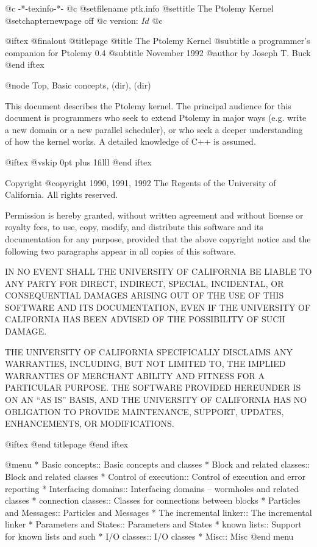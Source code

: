       @c -*-texinfo-*-
@c %
@setfilename ptk.info
@settitle The Ptolemy Kernel
@setchapternewpage off
@c version: $Id$
@c %

@iftex
@finalout
@titlepage
@title The Ptolemy Kernel
@subtitle a programmer's companion for Ptolemy 0.4
@subtitle November 1992
@author by Joseph T. Buck
@end iftex

@node Top, Basic concepts, (dir), (dir)

This document describes the Ptolemy kernel.  The principal audience for
this document is programmers who seek to extend Ptolemy in major ways
(e.g. write a new domain or a new parallel scheduler), or who seek a
deeper understanding of how the kernel works.  A detailed knowledge of
C++ is assumed.

@iftex
@vskip 0pt plus 1filll
@end iftex

Copyright @copyright{} 1990, 1991, 1992 The Regents of the University of
California.  All rights reserved.

Permission is hereby granted, without written agreement and without
license or royalty fees, to use, copy, modify, and distribute this
software and its documentation for any purpose, provided that the above
copyright notice and the following two paragraphs appear in all copies of
this software.

IN NO EVENT SHALL THE UNIVERSITY OF CALIFORNIA BE LIABLE TO ANY PARTY FOR
DIRECT, INDIRECT, SPECIAL, INCIDENTAL, OR CONSEQUENTIAL DAMAGES ARISING
OUT OF THE USE OF THIS SOFTWARE AND ITS DOCUMENTATION, EVEN IF THE
UNIVERSITY OF CALIFORNIA HAS BEEN ADVISED OF THE POSSIBILITY OF SUCH
DAMAGE.

THE UNIVERSITY OF CALIFORNIA SPECIFICALLY DISCLAIMS ANY WARRANTIES,
INCLUDING, BUT NOT LIMITED TO, THE IMPLIED WARRANTIES OF MERCHANT ABILITY
AND FITNESS FOR A PARTICULAR PURPOSE. THE SOFTWARE PROVIDED HEREUNDER IS
ON AN ``AS IS'' BASIS, AND THE UNIVERSITY OF CALIFORNIA HAS NO OBLIGATION
TO PROVIDE MAINTENANCE, SUPPORT, UPDATES, ENHANCEMENTS, OR MODIFICATIONS.

@iftex
@end titlepage
@end iftex

@menu
* Basic concepts::              Basic concepts and classes
* Block and related classes::   Block and related classes
* Control of execution::        Control of execution and error reporting
* Interfacing domains::         Interfacing domains -- wormholes and related classes
* connection classes::          Classes for connections between blocks
* Particles and Messages::      Particles and Messages
* The incremental linker::      The incremental linker
* Parameters and States::       Parameters and States
* known lists::                 Support for known lists and such
* I/O classes::                 I/O classes
* Misc::                        Misc
@end menu

